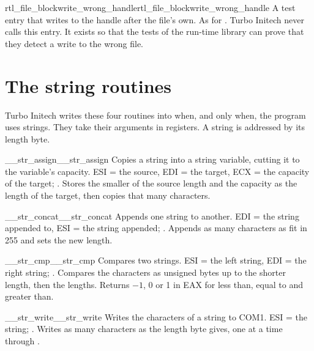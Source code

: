 \begin{RtlEntry}{rtl_file_blockwrite_wrong_handle}{rtl\_file\_blockwrite\_wrong\_handle}
\LFunction A test entry that writes to the handle after the file's own.
\LCalling As for .
\LRemarks Turbo Initech never calls this entry.  It exists so that the
tests of the run-time library can prove that they detect a write to the
wrong file.
\LSeeAlso {}
\end{RtlEntry}

\section{The string routines}
Turbo Initech writes these four routines into  when, and
only when, the program uses strings.  They take their arguments in
registers.  A string is addressed by its length byte.

\begin{RtlEntry}{__str_assign}{\_\_str\_assign}
\LFunction Copies a string into a string variable, cutting it to the
variable's capacity.
\LCalling ESI = the source, EDI = the target, ECX = the capacity of the
target; .
\LRemarks Stores the smaller of the source length and the capacity as the
length of the target, then copies that many characters.
\LSeeAlso {}
\end{RtlEntry}

\begin{RtlEntry}{__str_concat}{\_\_str\_concat}
\LFunction Appends one string to another.
\LCalling EDI = the string appended to, ESI = the string appended;
.
\LRemarks Appends as many characters as fit in 255 and sets the new length.
\LSeeAlso {}
\end{RtlEntry}

\begin{RtlEntry}{__str_cmp}{\_\_str\_cmp}
\LFunction Compares two strings.
\LCalling ESI = the left string, EDI = the right string;
.
\LRemarks Compares the characters as unsigned bytes up to the shorter
length, then the lengths.  Returns $-1$, 0 or 1 in EAX for less than, equal
to and greater than.
\LSeeAlso {}
\end{RtlEntry}

\begin{RtlEntry}{__str_write}{\_\_str\_write}
\LFunction Writes the characters of a string to COM1.
\LCalling ESI = the string; .
\LRemarks Writes as many characters as the length byte gives, one at a time
through .
\LSeeAlso {}
\end{RtlEntry}

